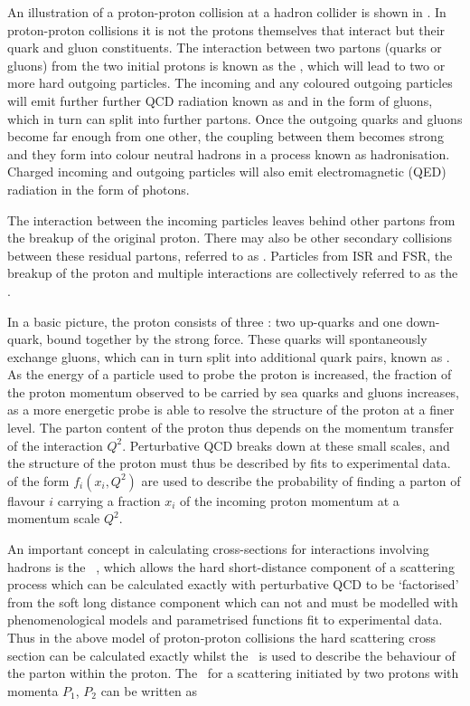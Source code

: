 An illustration of a proton-proton collision at a hadron collider is shown in
. In proton-proton collisions it is not the
protons themselves that interact but their quark and gluon constituents. The interaction between two  partons (quarks or gluons) from the two initial
protons is known as the , which will lead to two or more
hard outgoing particles. The incoming and any coloured outgoing particles will
emit further further QCD radiation known as  
and  in the form of gluons, which in turn can
split into further partons. Once the outgoing quarks and gluons become far enough from
one other, the coupling between them becomes strong and they form into colour neutral
hadrons in a process known as hadronisation. Charged incoming and outgoing
particles will also emit electromagnetic (QED) radiation in the form of photons. 

The interaction between the incoming
particles leaves behind other partons from the breakup of the original proton.
There may also be other secondary collisions between these residual partons,
referred to as . Particles from ISR and FSR, the breakup of the proton and
multiple interactions are collectively referred to as the .

In a basic picture, the proton consists of three :
two up-quarks and one down-quark, bound together by the strong force. These
quarks will spontaneously exchange gluons, which can in turn split into
additional quark pairs, known as . As the energy of a
particle used to probe the proton is increased, the fraction of the proton
momentum observed to be carried by sea quarks and gluons increases, as a more
energetic probe
is able to resolve the structure of the proton at a finer level. The parton content of
the proton thus depends on the momentum transfer of the interaction $Q^{2}$.
Perturbative QCD breaks down at these small scales, and the structure of the
proton must thus be described by fits to experimental data.  of the form $f_{i}(x_{i}, Q^{2})$ are used to describe the probability of finding a parton of flavour $i$ carrying a
fraction $x_i$ of the incoming proton momentum at a momentum scale $Q^{2}$.

An important concept in calculating cross-sections for interactions involving
hadrons is the ~\cite{ellis2003qcd}, which allows the hard
short-distance component of a scattering process which can be calculated
exactly with perturbative QCD to be `factorised' from the soft long distance component which can
not and must be modelled with phenomenological models and parametrised functions
fit to experimental data. Thus in the above model of proton-proton collisions
the hard scattering cross section can be calculated exactly whilst the
\partDF\ is used to describe the behaviour of the parton within the proton. The
\cx\ for a scattering initiated by two protons with momenta $P_{1}$, $P_{2}$ can
be written as

